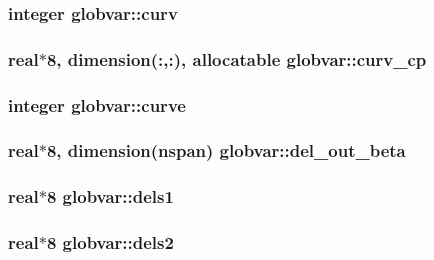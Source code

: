 \subsubsection[{curv}]{\setlength{\rightskip}{0pt plus 5cm}integer globvar\+::curv}\label{namespaceglobvar_afae25681092536554c592050d73058fb}
\hypertarget{namespaceglobvar_a533758dc33d13c7f7d7fc3b2c1b14f2b}{}
\subsubsection[{curv\+\_\+cp}]{\setlength{\rightskip}{0pt plus 5cm}real$\ast$8, dimension(\+:,\+:), allocatable globvar\+::curv\+\_\+cp}\label{namespaceglobvar_a533758dc33d13c7f7d7fc3b2c1b14f2b}
\hypertarget{namespaceglobvar_a6f236c2395c2e66434a26a568bbe2e08}{}
\subsubsection[{curve}]{\setlength{\rightskip}{0pt plus 5cm}integer globvar\+::curve}\label{namespaceglobvar_a6f236c2395c2e66434a26a568bbe2e08}
\hypertarget{namespaceglobvar_a6448057e4ac1ead4b9b9fa353a168a08}{}
\subsubsection[{del\+\_\+out\+\_\+beta}]{\setlength{\rightskip}{0pt plus 5cm}real$\ast$8, dimension({\bf nspan}) globvar\+::del\+\_\+out\+\_\+beta}\label{namespaceglobvar_a6448057e4ac1ead4b9b9fa353a168a08}
\hypertarget{namespaceglobvar_a2e4dc380073673328e48ca1cc486e306}{}
\subsubsection[{dels1}]{\setlength{\rightskip}{0pt plus 5cm}real$\ast$8 globvar\+::dels1}\label{namespaceglobvar_a2e4dc380073673328e48ca1cc486e306}
\hypertarget{namespaceglobvar_a76bb9ea1cf09a1a5737acf2a57ffaa74}{}
\subsubsection[{dels2}]{\setlength{\rightskip}{0pt plus 5cm}real$\ast$8 globvar\+::dels2}\label{namespaceglobvar_a76bb9ea1cf09a1a5737acf2a57ffaa74}
\hypertarget{namespaceglobvar_a9378a0ca5bc1638562a71eb8e31b439d}{}
